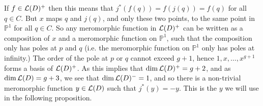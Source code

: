 \documentclass[11pt]{article} %
\theoremstyle{remark}
\newcommand{\cL}{{\cal L}}
\begin{document}
If $f\in \cL(D)^+$ then this means that $j^*(f(q))=f(j(q))=f(q)$ for all $q \in C$.
But $x$ maps $q$ and $j(q)$, and only these two points, to the same point in $\mathbb P^1$ for all $q\in C$.
So any meromorphic function in $\cL(D)^+$ can be written as a composition of $x$ and a meromorphic function on $\mathbb P^1$, such that the composition only has poles at $p$ and $q$ (i.e. the meromorphic function on $\mathbb{P}^1$ only has poles at infinity.)
The order of the pole at $p$ or $q$ cannot exceed $g+1$, hence $1,x,\ldots ,x^{g+1}$ forms a basis of $\cL(D)^+$.
As this implies that $\dim\cL(D)^+ = g+2$, and as $\dim\cL(D) = g+3$, we see that $\dim\cL(D)^- = 1$, and so there is a non-trivial meromorphic function $y \in \cL(D)$ such that $j^*(y) = -y$.
This is the $y$ we will use in the following proposition.\\
\end{document}
